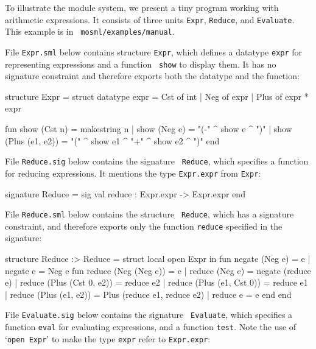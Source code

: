 \documentclass[fleqn]{article}
\begin{document}
To illustrate the module system, we present a tiny program working
with arithmetic expressions.  It consists of three units {\tt Expr},
{\tt Reduce}, and {\tt Evaluate}.  This example is in {\tt
  mosml/examples/manual}.

File {\tt Expr.sml} below contains structure {\tt Expr}, which defines
a datatype {\tt expr} for representing expressions and a function {\tt
  show} to display them.  It has no signature constraint and therefore
exports both the datatype and the function:

\begin{program}
structure Expr = struct
    datatype expr = Cst of int | Neg of expr | Plus of expr * expr
        
    fun show (Cst n)         = makestring n
      | show (Neg e)         = "(-" ^ show e ^ ")"
      | show (Plus (e1, e2)) = "(" ^ show e1 ^ "+" ^ show e2 ^ ")"
end
\end{program}

\noindent File {\tt Reduce.sig} below contains the signature {\tt
  Reduce}, which specifies a function for reducing expressions.  It
mentions the type {\tt Expr.expr} from {\tt Expr}:

\begin{program}
signature Reduce = sig
    val reduce : Expr.expr -> Expr.expr
end
\end{program}

\noindent File {\tt Reduce.sml} below contains the structure {\tt
  Reduce}, which has a signature constraint, and therefore exports
only the function {\tt reduce} specified in the signature:

\begin{program}
structure Reduce :> Reduce = struct
    local open Expr
    in
        fun negate (Neg e) = e
          | negate e       = Neg e
        fun reduce (Neg (Neg e))      = e
          | reduce (Neg e)            = negate (reduce e)
          | reduce (Plus (Cst 0, e2)) = reduce e2
          | reduce (Plus (e1, Cst 0)) = reduce e1
          | reduce (Plus (e1, e2))    = Plus (reduce e1, reduce e2)
          | reduce e                  = e
    end
end
\end{program}

\noindent File {\tt Evaluate.sig} below contains the signature {\tt
  Evaluate}, which specifies a function {\tt eval} for evaluating
expressions, and a function {\tt test}.  Note the use of `{\tt open
  Expr}' to make the type {\tt expr} refer to {\tt Expr.expr}:
\end{document}
